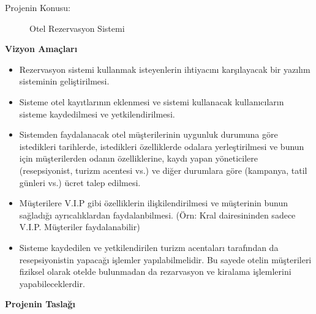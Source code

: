 \documentclass[12pt,a4paper]{article}
\begin{document}
\begin{description}
\item[Projenin Konusu:] Otel Rezervasyon Sistemi
\end{description}
{
\bf
Vizyon Amaçları
}

\begin{itemize}

\item {

Rezervasyon sistemi kullanmak isteyenlerin ihtiyacını karşılayacak bir yazılım sisteminin geliştirilmesi.

}

\item {

Sisteme otel kayıtlarının eklenmesi ve sistemi kullanacak kullanıcıların sisteme kaydedilmesi ve yetkilendirilmesi.

}

\item {

Sistemden faydalanacak otel müşterilerinin uygunluk durumuna göre istedikleri tarihlerde, istedikleri özelliklerde odalara yerleştirilmesi ve bunun için müşterilerden odanın özelliklerine, kaydı yapan yöneticilere (resepsiyonist, turizm acentesi vs.) ve diğer durumlara göre (kampanya, tatil günleri vs.) ücret talep edilmesi.

}

\item {

Müşterilere V.I.P gibi özelliklerin ilişkilendirilmesi ve müşterinin bunun sağladığı ayrıcalıklardan faydalanbilmesi. (Örn: Kral dairesininden sadece V.I.P. Müşteriler faydalanabilir)

}

\item {

Sisteme kaydedilen ve yetkilendirilen turizm acentaları tarafından da resepsiyonistin yapacağı işlemler yapılabilmelidir. Bu sayede otelin müşterileri fiziksel olarak otelde bulunmadan da rezarvasyon ve kiralama işlemlerini yapabileceklerdir. \\[2cm]

}

\end{itemize}

\bf {
Projenin Taslağı \\[0.2cm]
}

\end{document}
